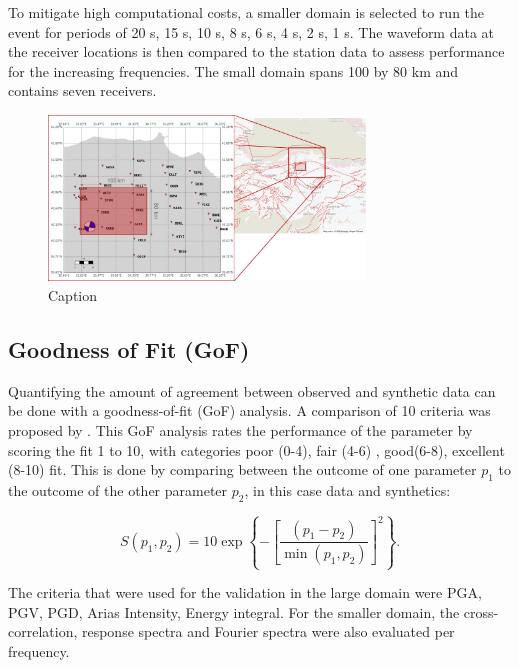 \documentclass[../Text/00main.tex]{subfiles}
\begin{document}
To mitigate high computational costs, a smaller domain is selected to run the event for periods of 20 s, 15 s, 10 s, 8 s, 6 s, 4 s, 2 s, 1 s. The waveform data at the receiver locations is then compared to the station data to assess performance for the increasing frequencies. The small domain spans 100 by 80 km and contains seven receivers. 


\begin{figure}
    \centering
    \includegraphics[width=0.75\textwidth]{images_methods/overviewfig-receivergrid-andsources-cubuk.png}
    \caption{Caption}
    \label{fig:cubuk_domain}
\end{figure}



\subsection{Goodness of Fit (GoF)}\label{ssec:GoF_explain}

Quantifying the amount of agreement between observed and synthetic data can be done with a goodness-of-fit (GoF) analysis. A comparison of 10 criteria was proposed by \citet{anderson_quantitative_nodate}. This GoF analysis rates the performance of the parameter by scoring the fit 1 to 10, with categories poor (0-4), fair (4-6) , good(6-8), excellent (8-10) fit. This is done by comparing between the outcome of one parameter $p_1$ to the outcome of the other parameter $p_2$, in this case data and synthetics:

\begin{equation}
S\left(p_{1}, p_{2}\right)=10 \exp \left\{-\left[\frac{\left(p_{1}-p_{2}\right)}{\min \left(p_{1}, p_{2}\right)}\right]^{2}\right\}.
\end{equation}

The criteria that were used for the validation in the large domain were PGA, PGV, PGD, Arias Intensity, Energy integral. For the smaller domain, the cross-correlation, response spectra and Fourier spectra were also evaluated per frequency. 
\end{document}
